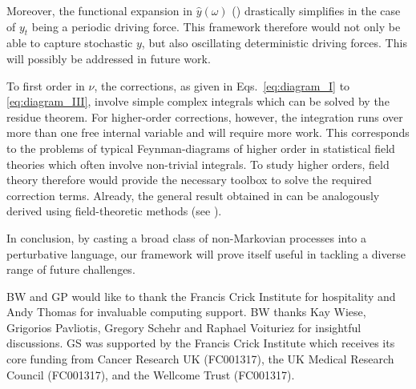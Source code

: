 \documentclass[%
 reprint,
superscriptaddress,
nofootinbib,
 amsmath,amssymb,
 aps,
prx,
]{revtex4-2}
\begin{document}
Moreover, the functional expansion in $\hat{y}(\omega)$ (\cf {}) drastically simplifies in the case of $y_t$ being a periodic driving force. This framework therefore would not only be able to capture stochastic $y$, but also oscillating deterministic driving forces. This will possibly be addressed in future work.

To first order in $\nu$, the corrections, as given in Eqs.~\eqref{eq:diagram_I} to \eqref{eq:diagram_III}, involve simple complex integrals which can be solved by the residue theorem. For higher-order corrections, however, the integration runs over more than one free internal variable and will require more work. This corresponds to the problems of typical Feynman-diagrams of higher order in statistical field theories which often involve non-trivial integrals. To study higher orders, field theory therefore would provide the necessary toolbox to solve the required correction terms. 
Already, the general result obtained in   can be analogously derived  using field-theoretic methods (see \cite{Walter2020}).

In conclusion, by casting a broad class of non-Markovian processes into a perturbative language, our framework will prove itself useful in tackling a diverse range of future challenges.




\acknowledgements
BW and GP would like to thank the Francis Crick Institute for hospitality and Andy Thomas for invaluable computing support. BW thanks Kay Wiese, Grigorios Pavliotis, Gregory Schehr and Raphael Voituriez for insightful discussions. GS was supported by the Francis Crick Institute which receives its core funding from Cancer Research UK (FC001317), the UK Medical Research Council (FC001317), and the Wellcome Trust (FC001317).

\renewcommand{\emph}[1]{\textit{#1}}

\end{document}
